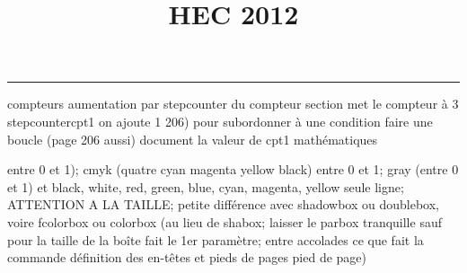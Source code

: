 \documentclass[11pt]{article}%
\title{\bf \vspace{-1cm} HEC 2012} %
\author{} %
\date{} %
\renewcommand{\headrulewidth}{0pt}%
\renewcommand{\footrulewidth}{0.4pt}%
\begin{document}
\maketitle %
\vspace{-1.2cm}\hrule %
\thispagestyle{fancy}

\vspace*{.4cm}


compteurs%
aumentation par stepcounter du compteur section%
met le compteur à 3%
stepcounter{cpt1} on ajoute 1%
206) pour subordonner à une condition %
faire une boucle (page 206 aussi) %
document la valeur de cpt1 
mathématiques\newcommand{\ch}{\operatorname{ch}} 
\newcommand{\sh}{\operatorname{sh}}
\renewcommand{\tanh}{\operatorname{th}}
\renewcommand{\sinh}{\operatorname{sh}}
\renewcommand{\cosh}{\operatorname{ch}}
\newcommand{\argsh}{\operatorname{argsh}}
\newcommand{\argch}{\operatorname{argch}}
\newcommand{\argth}{\operatorname{argth}}
\newcommand{\Id}{\operatorname{Id}}
\renewcommand{\leq}{\leq}
\renewcommand{\geq}{\geq }

\newcommand{\dlim}{\lim}
\newcommand{\dsum}{\sum}
\newcommand{\dprod}{\prod}



entre 0 et 1); cmyk (quatre cyan magenta yellow black) entre 0 et 1;
gray (entre 0 et 1) et black, white, red, green, blue, cyan, magenta,
yellow%
seule ligne; ATTENTION A LA TAILLE; petite différence avec shadowbox ou
doublebox, voire fcolorbox ou colorbox (au lieu de shabox; laisser le
parbox tranquille sauf pour la taille de la boîte
\newcommand{\Tbox}[1]{\begin{center} \shabox{\parbox{0.6
\linewidth}{#1}} \end{center}} %
fait le 1er paramètre; entre accolades ce que fait la commande
définition des en-têtes et pieds de pages\pagestyle{fancy}
\chead{}
\rfoot[ \ \thepage]{\thepage}
\cfoot{}
\lfoot{}
\thispagestyle{fancy} %
pied de page)\renewcommand{\footrulewidth}{0.4pt}
\renewcommand{\headrulewidth}{0.4pt}
\end{document}
